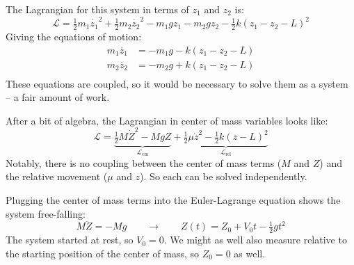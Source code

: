 \documentclass[12pt]{article}
\newcommand{\purple}[1]{{\color{purple} #1}}
\begin{document}
\purple{

The Lagrangian for this system in terms of $z_1$ and $z_2$ is:
$$
\mathcal{L} = \tfrac{1}{2} m_1 \dot{z_1}^2 + \tfrac{1}{2} m_2 \dot{z_2}^2 - m_1 g z_1 - m_2 g z_2 - \tfrac{1}{2} k \left( z_1 - z_2 - L \right)^2
$$
Giving the equations of motion:
\begin{align*}
    m_1 \ddot{z_1} &= -m_1 g - k \left( z_1 - z_2 - L \right) \\
    m_2 \ddot{z_2} &= -m_2 g + k \left( z_1 - z_2 - L \right) \\
\end{align*}
These equations are coupled, so it would be necessary to solve them as a system -- a fair amount of work.

After a bit of algebra, the Lagrangian in center of mass variables looks like:
$$
\mathcal{L} = \underbrace{ \tfrac{1}{2} M \dot{Z}^2 - M g Z }_{\mathcal{L}_\text{cm}} + \underbrace{ \tfrac{1}{2} \mu \dot{z}^2 - \tfrac{1}{2} k \left( z - L \right)^2 }_{\mathcal{L}_\text{rel}}
$$
Notably, there is no coupling between the center of mass terms ($M$ and $Z$) and the relative movement ($\mu$ and $z$). So each can be solved independently. 

Plugging the center of mass terms into the Euler-Lagrange equation shows the system free-falling:
$$
M\ddot{Z} = -Mg
\quad\quad\rightarrow\quad\quad
Z(t) = Z_0 + V_0 t - \tfrac{1}{2}gt^2
$$
The system started at rest, so $V_0=0$. We might as well also measure relative to the starting position of the center of mass, so $Z_0=0$ as well.

}
\end{document}
